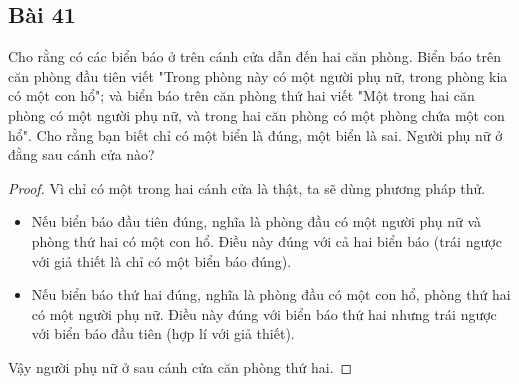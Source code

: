 \subsection*{Bài 41}
Cho rằng có các biển báo ở trên cánh cửa dẫn đến hai căn phòng. Biển báo trên căn phòng đầu tiên viết "Trong phòng này có một người phụ nữ, trong phòng kia có một con hổ"; và biển báo trên căn phòng thứ hai viết "Một trong hai căn phòng có một người phụ nữ, và trong hai căn phòng có một phòng chứa một con hổ". Cho rằng bạn biết chỉ có một biển là đúng, một biển là sai. Người phụ nữ ở đằng sau cánh cửa nào?
\begin{proof}
    Vì chỉ có một trong hai cánh cửa là thật, ta sẽ dùng phương pháp thử.
    \begin{itemize}
        \item Nếu biển báo đầu tiên đúng, nghĩa là phòng đầu có một người phụ nữ và phòng thứ hai có một con hổ. Điều này đúng với cả hai biển báo (trái ngược với giả thiết là chỉ có một biển báo đúng).
        \item Nếu biển báo thứ hai đúng, nghĩa là phòng đầu có một con hổ, phòng thứ hai có một người phụ nữ. Điều này đúng với biển báo thứ hai nhưng trái ngược với biển báo đầu tiên (hợp lí với giả thiết).
    \end{itemize}
    Vậy người phụ nữ ở sau cánh cửa căn phòng thứ hai.
\end{proof}